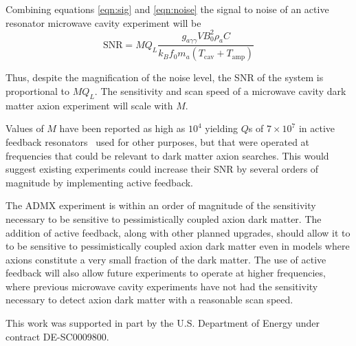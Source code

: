 \documentclass[aps,prl,twocolumn,groupedaddress]{revtex4-1}
\begin{document}
Combining equations \ref{eqn:sig} and \ref{eqn:noise} the signal to noise of an active resonator microwave cavity experiment will be
\begin{equation}
\mathrm{SNR}=M Q_L\frac{g_{a\gamma\gamma}VB_0^2\rho_aC}{k_B f_0 m_a\left(T_{\mathrm{cav}}+T_{\mathrm{amp}}\right)}
\end{equation}

Thus, despite the magnification of the noise level, the SNR of the system is proportional to $MQ_L$.  The sensitivity and scan speed of a microwave cavity dark matter axion experiment will scale with $M$.

Values of $M$ have been reported as high as $10^4$ yielding $Q$s of $7\times10^7$ in active feedback resonators~\cite{:/content/aip/journal/rsi/84/8/10.1063/1.4817537} used for other purposes, but that were operated at frequencies that could be relevant to dark matter axion searches.
This would suggest existing experiments could increase their SNR by several orders of magnitude by implementing active feedback.

The ADMX experiment is within an order of magnitude of the sensitivity necessary to be sensitive to pessimistically coupled axion dark matter.  The addition of active feedback, along with other planned upgrades, should allow it to to be sensitive to pessimistically coupled axion dark matter even in models where axions constitute a very small fraction of the dark matter.  The use of active feedback will also allow future experiments to operate at higher frequencies, where previous microwave cavity experiments have not had the sensitivity necessary to detect axion dark matter with a reasonable scan speed.

This work was supported in part by the U.S. Department of Energy under contract DE-SC0009800.



\end{document}
